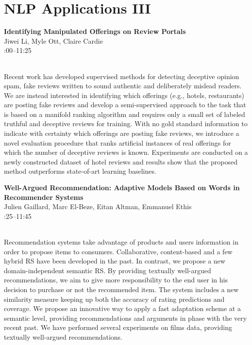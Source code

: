 \documentclass[twoside,makeidx]{book}
\renewcommand{\normalsize}{\fontsize{8}{9}\selectfont}
\renewcommand{\small}{\fontsize{7}{8}\selectfont}
\begin{document}
\section{NLP Applications III}
\vspace{-1em}
\par\vspace{2em}\noindent%
\begin{minipage}{\linewidth}%
\begin{center}
\textbf{\normalsize Identifying Manipulated Offerings on Review Portals}\\
\normalsize  Jiwei Li,  Myle Ott,  Claire Cardie\\
{\small 11:00--11:25}\\
\end{center}
\end{minipage}\\[0.5em]
\nopagebreak%
\noindent%
{\small Recent work has developed supervised methods for detecting deceptive opinion spam, fake  reviews written to sound authentic and deliberately mislead readers.  We are instead interested in  identifying which offerings (e.g., hotels, restaurants) are  posting fake reviews and develop a semi-supervised approach to  the task that is based on a manifold ranking algorithm and requires  only a small set of labeled truthful and deceptive reviews for training. With no gold standard information to indicate with certainty which offerings are posting fake reviews, we introduce a novel evaluation procedure that ranks artificial instances of real offerings for which the number of deceptive reviews is known. Experiments are conducted on a newly constructed dataset of hotel reviews and  results show that the proposed method outperforms state-of-art learning baselines.}
\par\vspace{2em}\noindent%
\begin{minipage}{\linewidth}%
\begin{center}
\textbf{\normalsize Well-Argued Recommendation: Adaptive Models Based on Words in Recommender Systems}\\
\normalsize  Julien Gaillard,  Marc El-Beze,  Eitan Altman,  Emmanuel Ethis\\
{\small 11:25--11:45}\\
\end{center}
\end{minipage}\\[0.5em]
\nopagebreak%
\noindent%
{\small Recommendation systems take advantage of products and users information in order to propose items to consumers. Collaborative, content-based and a few hybrid RS have been developed in the past.  In contrast, we propose a new domain-independent semantic RS. By providing textually well-argued recommendations, we aim to give more responsibility to the end user in his decision to purchase or not the recommended item. The system includes a new similarity measure keeping up both the accuracy of rating predictions and coverage.  We propose an innovative way to apply a fast adaptation scheme at a semantic level, providing recommendations and arguments in phase with the very recent past. We have performed several experiments on films data, providing textually well-argued recommendations.}
\clearpage
\end{document}
